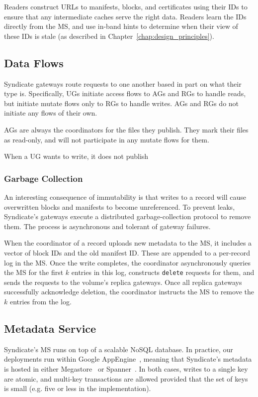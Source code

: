 Readers construct URLs to manifests, blocks, and certificates using their IDs to
ensure that any intermediate caches serve the right data.  Readers learn the IDs
directly from the MS, and use in-band hints to determine when their view of
these IDs is stale (as described in Chapter~\ref{chap:design_principles}).

\subsection{Data Flows}

Syndicate gateways route requests to one another based in part on what their
type is.  Specifically,
UGs initiate access flows to AGs and RGs to handle reads, but initiate mutate
flows only to RGs to handle writes.  AGs and RGs do not initiate any flows of
their own.

AGs are always the coordinators for the files they publish.  They mark their
files as read-only, and will not participate in any mutate flows for them.

When a UG wants to write, it does not publish

\subsubsection{Garbage Collection}

An interesting consequence of immutability is that writes to a record will cause
overwritten blocks and manifests to become unreferenced.  To prevent leaks, Syndicate's gateways
execute a distributed garbage-collection protocol to remove them.  The process
is asynchronous and tolerant of gateway failures.

When the coordinator of a record uploads new metadata to the MS, it includes a
vector of block IDs and the old manifest ID.  These are appended to a per-record
log in the MS.  Once the write completes, the coordinator asynchronously queries
the MS for the first $k$ entries in this log, constructs \texttt{delete}
requests for them, and sends the requests to the volume's replica gateways.
Once all replica gateways successfully acknowledge deletion, the coordinator
instructs the MS to remove the $k$ entries from the log.

\subsection{Metadata Service}

Syndicate's MS runs on top of a scalable NoSQL database.  In practice, our
deployments run within Google AppEngine~\cite{google-appengine}, meaning that
Syndicate's metadata is hosted in either Megastore~\cite{megastore} or
Spanner~\cite{spanner}.  In both cases, writes to a single key are atomic, and
multi-key transactions are allowed provided that the set of keys is small (e.g.
five or less in the implementation).

